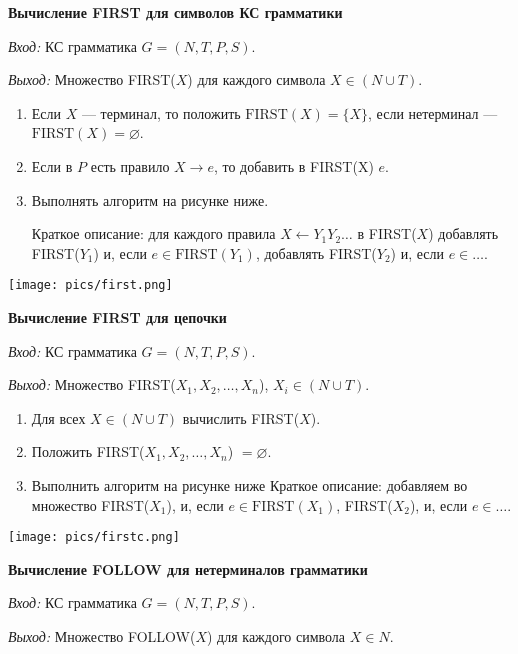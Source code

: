 \textbf{Вычисление FIRST для символов КС грамматики}

\textit{Вход:} КС грамматика $G = (N, T, P, S)$.

\textit{Выход:} Множество FIRST($X$) для каждого символа $X \in (N \cup T)$.

\begin{enumerate}
    \item Если $X$ --- терминал, то положить $\text{FIRST}(X) = \{X\}$, если нетерминал --- $\text{FIRST}(X) = \varnothing$.
    \item Если в $P$ есть правило $X \rightarrow e$, то добавить в FIRST(X) $e$.
    \item Выполнять алгоритм на рисунке ниже.

    Краткое описание: для каждого правила $X \leftarrow Y_1 Y_2 \dots$ в FIRST($X$) добавлять FIRST($Y_1$) и, если $e \in \text{FIRST}(Y_1)$, добавлять FIRST($Y_2$) и, если $e \in \dots$.
\end{enumerate}

\texttt{[image: pics/first.png]}

\textbf{Вычисление FIRST для цепочки}

\textit{Вход:} КС грамматика $G = (N, T, P, S)$.

\textit{Выход:} Множество FIRST($X_1, X_2, \dots, X_n$), $X_i \in (N \cup T)$.


\begin{enumerate}
    \item Для всех $X \in (N \cup T)$ вычислить FIRST($X$).
    \item Положить FIRST($X_1, X_2, \dots, X_n$) $ = \varnothing$.
    \item Выполнить алгоритм на рисунке ниже \newline
    Краткое описание: добавляем во множество FIRST($X_1$), и, если $e \in \text{FIRST}(X_1)$, FIRST($X_2$), и, если $e \in \dots$.
\end{enumerate}

\texttt{[image: pics/firstc.png]}

\textbf{Вычисление FOLLOW для нетерминалов грамматики}

\textit{Вход:} КС грамматика $G = (N, T, P, S)$.

\textit{Выход:} Множество FOLLOW($X$) для каждого символа $X \in N$.

